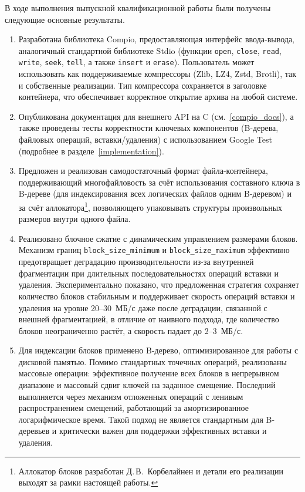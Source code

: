  \label{conclusion1}

В ходе выполнения выпускной квалификационной работы были получены следующие основные результаты.

\begin{enumerate}
    \item Разработана библиотека Compio, предоставляющая интерфейс ввода-вывода, аналогичный стандартной библиотеке Stdio (функции \texttt{open}, \texttt{close}, \texttt{read}, \texttt{write}, \texttt{seek}, \texttt{tell}, а также \texttt{insert} и \texttt{erase}). Пользователь может использовать как поддерживаемые компрессоры (Zlib, LZ4, Zstd, Brotli), так и собственные реализации. Тип компрессора сохраняется в заголовке контейнера, что обеспечивает корректное открытие архива на любой системе.

    \item Опубликована документация для внешнего API на C (см.~\ref{compio_docs}), а также проведены тесты корректности ключевых компонентов (B-дерева, файловых операций, вставки/удаления) с использованием Google Test (подробнее в разделе~\ref{implementation}). 

    \item Предложен и реализован самодостаточный формат файла-контейнера, поддерживающий многофайловость за счёт использования составного ключа в B-дереве (для индексирования всех логических файлов одним B-деревом) и за счёт аллокатора\footnote{Аллокатор блоков разработан Д.\,В.~Корбелайнен и детали его реализации выходят за рамки настоящей работы.}, позволяющего упаковывать структуры произвольных размеров внутри одного файла.

    \item Реализовано блочное сжатие с динамическим управлением размерами блоков. Механизм границ \texttt{block\_size\_minimum} и \texttt{block\_size\_maximum} эффективно предотвращает деградацию производительности из-за внутренней фрагментации при длительных последовательностях операций вставки и удаления. Экспериментально показано, что предложенная стратегия сохраняет количество блоков стабильным и поддерживает скорость операций вставки и удаления на уровне 20--30~МБ/с даже после деградации, связанной с внешней фрагментацией, в отличие от наивного подхода, где количество блоков неограниченно растёт, а скорость падает до 2--3~МБ/с.

    \item Для индексации блоков применено B-дерево, оптимизированное для работы с дисковой памятью. Помимо стандартных точечных операций, реализованы массовые операции: эффективное получение всех блоков в непрерывном диапазоне и массовый сдвиг ключей на заданное смещение. Последний выполняется через механизм отложенных операций с ленивым распространением смещений, работающий за амортизированное логарифмическое время. Такой подход не является стандартным для B-деревьев и критически важен для поддержки эффективных вставки и удаления.


\end{enumerate}
